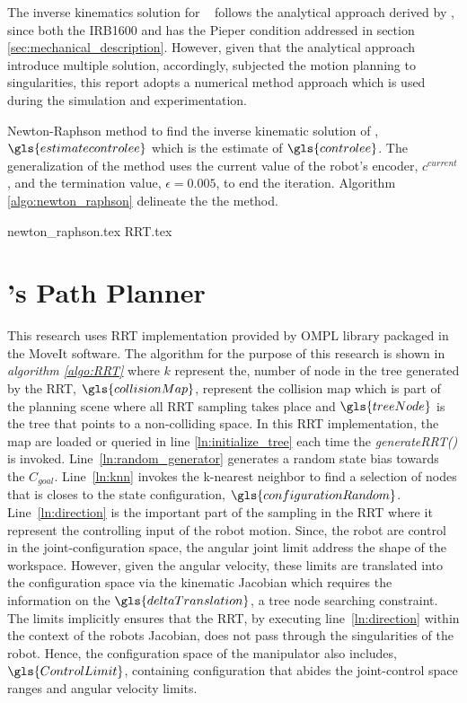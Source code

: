The inverse kinematics solution for \rimini~ follows the analytical
approach derived by \textcite{Pires2007}, since both the IRB1600 and \rimini
has the Pieper condition addressed in section \ref{sec:mechanical_description}.
However, given that the analytical approach
introduce multiple solution, accordingly, 
subjected the motion planning to singularities, this report adopts a 
numerical method approach which is 
used during the simulation and experimentation. 

Newton-Raphson method to find the inverse kinematic solution of 
\rimini, $\gls{estimatecontrolee}$ which is the estimate of $\gls{controlee}$. The generalization of the method uses the current value of the 
robot's encoder, $c^{current}$, and the termination value, $\epsilon=0.005$,
to end the iteration. Algorithm \ref{algo:newton_raphson} delineate the 
the method.

{newton_raphson.tex}
{RRT.tex}

\section{\rimini's Path Planner}\label{sec:planning_rimini}
This research uses RRT implementation provided by OMPL library
packaged in the MoveIt software. The algorithm for the purpose 
of this research is shown in \textit{algorithm \ref{algo:RRT}}
where $k$ represent the, number of node in the 
tree generated by the RRT, $\gls{collisionMap}$, represent the collision map
which is part of the planning scene where all
RRT sampling takes place and $\gls{treeNode}$ is the tree 
that points to a non-colliding space. In this RRT implementation, 
the map are loaded or queried in line \ref{ln:initialize_tree} 
each time the \textit{generateRRT()} is invoked.
Line~\ref{ln:random_generator} generates a random state bias towards
the $C_{goal}$.
Line~\ref{ln:knn} invokes the k-nearest neighbor to find a selection 
of nodes that is closes to the state configuration, $\gls{configurationRandom}$.
Line~\ref{ln:direction} is the important part of the sampling 
in the RRT where it represent the controlling input of the
robot motion. Since, the robot are control in the joint-configuration
space, the angular joint limit address the shape
of the workspace. However, given the angular velocity, 
these limits are translated into 
the configuration space via the kinematic Jacobian which requires
the information on the $\gls{deltaTranslation}$, a tree node searching constraint. 
The limits implicitly ensures 
that the RRT, by executing line~\ref{ln:direction} within the context 
of the robots Jacobian, does not pass through the singularities of 
the robot. Hence, the configuration space of the manipulator 
also includes, $\gls{ControlLimit}$, containing configuration
that abides the joint-control space ranges and angular velocity
limits.

